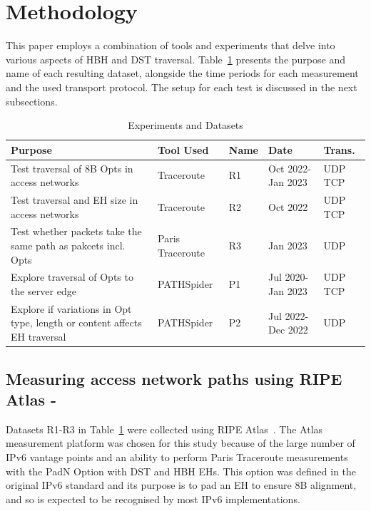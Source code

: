\documentclass[conference]{IEEEtran}
\begin{document}
\section{Methodology} 
\label{sec:methodology}

This paper employs a combination of tools and experiments that
delve into various aspects of HBH and DST traversal. Table~\ref{tbl:datasets} presents the purpose and name of each resulting dataset, alongside the time periods for each measurement and the used transport protocol. The setup for each test is discussed in the next subsections.


\begin{table}
\begin{tabular}{p{}|p{}|p{}|p{}|p{}}
Purpose                                                                          & Tool Used        & Name & Date               & Trans. \\
\hline
Test traversal of 8B Opts in access networks                                  & Traceroute       & R1           & Oct 2022- Jan 2023 & UDP TCP          \\
\hline
Test traversal and EH size in access networks                                & Traceroute       & R2           & Oct 2022           & UDP TCP          \\
\hline
Test whether packets take the same path as pakcets incl. Opts & Paris Traceroute & R3           & Jan 2023           & UDP               \\
\hline
Explore traversal of Opts to the server edge                              & PATHSpider       & P1           & Jul 2020- Jan 2023 & UDP TCP          \\
\hline
Explore if variations in Opt type, length or content affects EH traversal   & PATHSpider       & P2           & Jul 2022- Dec 2022     & UDP              
\end{tabular}
  \caption{Experiments and Datasets}
  \label{tbl:datasets}
\end{table}


    \subsection{Measuring access network paths using RIPE Atlas - }
    \label{sec:ripe-methodology}

Datasets R1-R3 in Table~\ref{tbl:datasets} were collected using RIPE Atlas~\cite{bajpai2015lessons}.
The Atlas measurement platform was chosen for this study because of the large number of IPv6 vantage points and an ability to perform Paris Traceroute measurements with the PadN Option with DST and HBH EHs. This option was defined in the original IPv6 standard and its purpose is to pad an EH to ensure 8B alignment, and so is expected to be recognised by most IPv6 implementations.
\end{document}

